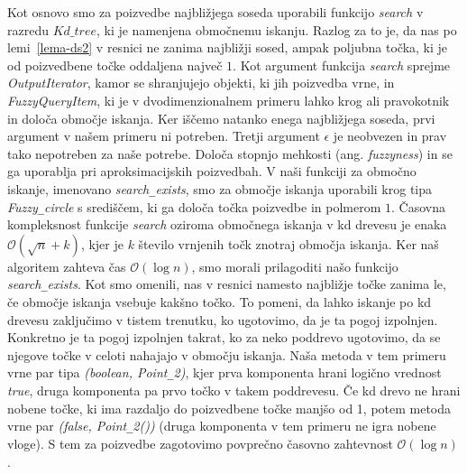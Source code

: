 \documentclass[a4paper, 12pt]{book}
\newcommand{\OO}{\ensuremath{\mathcal{O}}} %
\newcommand{\U}{\texttt{\_}}
\begin{document}
Kot osnovo smo za poizvedbe najbližjega soseda uporabili funkcijo \textit{search} v razredu $Kd{\_}tree$, ki je namenjena območnemu iskanju. Razlog za to je, da nas po lemi~\ref{lema-ds2} v resnici ne zanima najbližji sosed, ampak poljubna točka, ki je od poizvedbene točke oddaljena največ $1$. Kot argument funkcija \textit{search} sprejme \textit{OutputIterator}, kamor se shranjujejo objekti, ki jih poizvedba vrne, in \textit{FuzzyQueryItem}, ki je v dvodimenzionalnem primeru lahko krog ali pravokotnik in določa območje iskanja. Ker iščemo natanko enega najbližjega soseda, prvi argument v našem primeru ni potreben. Tretji argument $\epsilon$ je neobvezen in prav tako nepotreben za naše potrebe. Določa stopnjo mehkosti (ang. \textit{fuzzyness}) in se ga uporablja pri aproksimacijskih poizvedbah. V naši funkciji za območno iskanje, imenovano \textit{search\U exists}, smo za območje iskanja uporabili krog tipa \textit{Fuzzy\U circle} s središčem, ki ga določa točka poizvedbe in polmerom $1$. Časovna kompleksnost funkcije \textit{search} oziroma območnega iskanja v kd drevesu je enaka $\OO(\sqrt{n} + k)$, kjer je $k$ število vrnjenih točk znotraj območja iskanja. Ker naš algoritem zahteva čas $\OO(\log n)$, smo morali prilagoditi našo funkcijo \textit{search\U exists}. Kot smo omenili, nas v resnici namesto najbližje točke zanima le, če območje iskanja vsebuje kakšno točko. To pomeni, da lahko iskanje po kd drevesu zaključimo v tistem trenutku, ko ugotovimo, da je ta pogoj izpolnjen. Konkretno je ta pogoj izpolnjen takrat, ko za neko poddrevo ugotovimo, da se njegove točke v celoti nahajajo v območju iskanja. Naša metoda v tem primeru vrne par tipa \textit{(boolean, Point\U 2)}, kjer prva komponenta hrani logično vrednost \textit{true}, druga komponenta pa prvo točko v takem poddrevesu. Če kd drevo ne hrani nobene točke, ki ima razdaljo do poizvedbene točke manjšo od 1, potem metoda vrne par \textit{(false, Point\U 2())} (druga komponenta v tem primeru ne igra nobene vloge). S tem za poizvedbe zagotovimo povprečno časovno zahtevnost $\OO(\log n)$.
\end{document}
